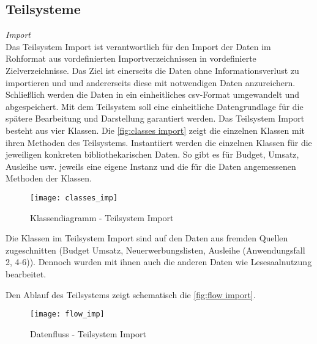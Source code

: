 
        

    \subsection{Teilsysteme}
    
    \textit{Import}\\
    Das Teilsystem Import ist verantwortlich für den Import der Daten im Rohformat aus vordefinierten Importverzeichnissen in vordefinierte Zielverzeichnisse. Das Ziel
    ist einerseits die Daten ohne Informationsverlust zu importieren und und andererseits diese mit notwendigen Daten anzureichern. Schließlich werden die Daten
    in ein einheitliches csv-Format umgewandelt und abgespeichert. Mit dem Teilsystem soll eine einheitliche Datengrundlage für die spätere Bearbeitung
    und Darstellung garantiert werden.
    Das Teilsystem Import besteht aus vier Klassen. Die \autoref{fig:classes import} zeigt die einzelnen Klassen mit ihren Methoden des 
    Teilsystems. Instantiiert werden die einzelnen Klassen für die jeweiligen konkreten bibliothekarischen Daten. So gibt es für Budget, Umsatz, Ausleihe usw.
    jeweils eine eigene Instanz und die für die Daten angemessenen Methoden der Klassen.
    
    \begin{figure}[H]
        \centering
            \texttt{[image: classes\_imp]}
            \caption{Klassendiagramm - Teilsystem Import}
            \label{fig:classes import}
    \end{figure}

    Die Klassen im Teilsystem Import sind auf den Daten aus fremden Quellen zugeschnitten
    (Budget Umsatz, Neuerwerbungslisten, Ausleihe (Anwendungsfall 2, 4-6)). Dennoch wurden mit ihnen auch die anderen Daten
    wie Lesesaalnutzung bearbeitet. 

    Den Ablauf des Teilsystems zeigt schematisch die \autoref{fig:flow import}.

    \begin{figure}[H]
        \centering
            \texttt{[image: flow\_imp]}
            \caption{Datenfluss - Teilsystem Import}
            \label{fig:flow import}
    \end{figure}

